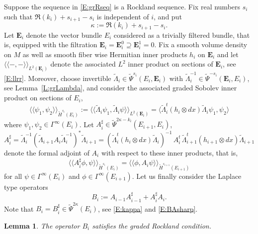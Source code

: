 \documentclass[reqno,12pt]{amsart}
\newcommand\llangle{\langle\!\langle}
\newcommand\rrangle{\rangle\!\rangle}
\theoremstyle{plain}
\newtheorem{lemma}[theorem]{Lemma}
\theoremstyle{definition}
\begin{document}
Suppose the sequence in \eqref{E:grRseq} is a Rockland sequence.
Fix real numbers $s_i$ such that $\Re(k_i)+s_{i+1}-s_i$ is independent of $i$, and put
\begin{equation}\label{E:kappa}
\kappa:=\Re(k_i)+s_{i+1}-s_i.
\end{equation}
Let $\mathbf E_i$ denote the vector bundle $E_i$ considered as a trivially filtered bundle, that is, equipped with the filtration $\mathbf E_i=\mathbf E_i^0\supseteq\mathbf E^1_i=0$.
Fix a smooth volume density on $M$ as well as smooth fiber wise Hermitian inner products $h_i$ on $\mathbf E_i$ and let $\llangle-,-\rrangle_{L^2(\mathbf E_i)}$ denote the associated $L^2$ inner product on sections of $\mathbf E_i$, see \eqref{E:llrr}.
Moreover, choose invertible $\tilde\Lambda_i\in\tilde\Psi^{s_i}(E_i,\mathbf E_i)$ with $\tilde\Lambda_i^{-1}\in\tilde\Psi^{-s_i}(\mathbf E_i,E_i)$, see Lemma~\ref{L:grLambda}, and consider the associated graded Sobolev inner product on sections of $E_i$,
\begin{equation}\label{E:grHSllrri}
\llangle\psi_1,\psi_2\rrangle_{\tilde H^{s_i}(E_i)}
:=\llangle\tilde\Lambda_i\psi_1,\tilde\Lambda_i\psi\rrangle_{L^2(\mathbf E_i)}
=\langle\tilde\Lambda_i^t(h_i\otimes dx)\tilde\Lambda_i\psi_1,\psi_2\rangle
\end{equation}
where $\psi_1,\psi_2\in\Gamma^\infty(E_i)$.
Let $A_i^\sharp\in\tilde\Psi^{2\kappa-k_i}(E_{i+1},E_i)$, 
$$
A_i^\sharp
=\tilde\Lambda_i^{-1}(\tilde\Lambda_{i+1}A_i\tilde\Lambda_i^{-1})^*\tilde\Lambda_{i+1}
=(\tilde\Lambda_i^t(h_i\otimes dx)\tilde\Lambda_i)^{-1}\,A^t_i\,\tilde\Lambda_{i+1}^t(h_{i+1}\otimes dx)\tilde\Lambda_{i+1}
$$
denote the formal adjoint of $A_i$ with respect to these inner products, that is, 
$$
\llangle A_i^\sharp\phi,\psi\rrangle_{\tilde H^{s_i}(E_i)}=\llangle\phi,A_i\psi\rrangle_{\tilde H^{s_{i+1}}(E_{i+1})}
$$ 
for all $\psi\in\Gamma^\infty(E_i)$ and $\phi\in\Gamma^\infty(E_{i+1})$.
Let us finally consider the Laplace type operators 
$$
B_i:=A_{i-1}A_{i-1}^\sharp+A_i^\sharp A_i.
$$
Note that $B_i=B_i^\sharp\in\tilde\Psi^{2\kappa}(E_i)$, see \eqref{E:kappa} and \eqref{E:BAsharp}.


\begin{lemma}\label{L:Delta}
The operator $B_i$ satisfies the graded Rockland condition.
\end{lemma}
\end{document}
